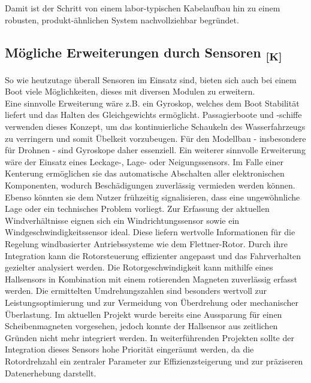 \documentclass[a4paper,12pt]{article}
\begin{document}
Damit ist der Schritt von einem labor-typischen Kabelaufbau hin zu einem robusten,
produkt-ähnlichen System nachvollziehbar begründet.


\subsection{\texorpdfstring{Mögliche Erweiterungen durch Sensoren \textsubscript{[K]}}{Mögliche Erweiterungen durch Sensoren [K]}}


So wie heutzutage überall Sensoren im Einsatz sind, bieten sich auch bei einem Boot viele Möglichkeiten, dieses mit diversen Modulen zu erweitern. 
\\[1em]
Eine sinnvolle Erweiterung wäre z.B. ein Gyroskop, welches dem Boot Stabilität liefert und das Halten des Gleichgewichts ermöglicht. Passagierboote und -schiffe verwenden dieses Konzept, um das kontinuierliche Schaukeln des Wasserfahrzeugs zu verringern und somit Übelkeit vorzubeugen. Für den Modellbau - insbesondere für Drohnen - sind Gyroskope daher essenziell. 
\newline \newline
Ein weiterer sinnvolle Erweiterung wäre der Einsatz eines Leckage-, Lage- oder Neigungssensors. Im Falle einer Kenterung ermöglichen sie das automatische Abschalten aller elektronischen Komponenten, wodurch Beschädigungen zuverlässig vermieden werden können. Ebenso könnten sie dem Nutzer frühzeitig signalisieren, dass eine ungewöhnliche Lage oder ein technisches Problem vorliegt.
\newline \newline
Zur Erfassung der aktuellen Windverhältnisse eignen sich ein Windrichtungssensor sowie ein Windgeschwindigkeitssensor ideal. Diese liefern wertvolle Informationen für die Regelung windbasierter Antriebssysteme wie dem Flettner-Rotor. Durch ihre Integration kann die Rotorsteuerung effizienter angepasst und das Fahrverhalten gezielter analysiert werden.
\newline \newline
Die Rotorgeschwindigkeit kann mithilfe eines Hallsensors in Kombination mit einem rotierenden Magneten zuverlässig erfasst werden. Die ermittelten Umdrehungszahlen sind besonders wertvoll zur Leistungsoptimierung und zur Vermeidung von Überdrehung oder mechanischer Überlastung. Im aktuellen Projekt wurde bereits eine Aussparung für einen Scheibenmagneten vorgesehen, jedoch konnte der Hallsensor aus zeitlichen Gründen nicht mehr integriert werden. In weiterführenden Projekten sollte der Integration dieses Sensors hohe Priorität eingeräumt werden, da die Rotordrehzahl ein zentraler Parameter zur Effizienzsteigerung und zur präziseren Datenerhebung darstellt.
\end{document}
